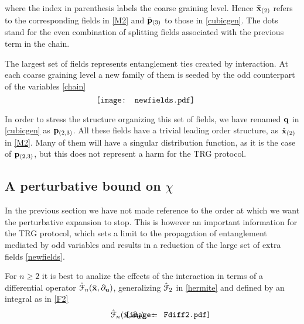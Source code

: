 \documentclass[a4paper,preprintnumbers,nofootinbib,twocolumn]{quantumarticle}
\begin{document}
\noindent  where the index in parenthesis labels the coarse graining level. 
Hence ${\bar {\bf x}}_{(2)}$ refers to the corresponding fields in \eqref{M2} and ${\bar {\bf p}}_{(3)}$ to those in \eqref{cubicgen}.
The dots stand for the even combination of splitting fields associated with the previous term in the chain.

The largest set of fields represents entanglement ties created by interaction. At each coarse graining level a new family of them is seeded by the odd counterpart
of the variables \eqref{chain}
\vspace*{-2.4cm}
\begin{equation}
 \vcenter{\hbox{\hspace{-17mm} \texttt{[image: newfields.pdf]}}} \hspace{-10mm}
\label{newfields} 
\end{equation}
\vspace*{-2.6cm}

\noindent In order to stress the structure organizing this set of fields,
we have renamed ${\bf q}$ in \eqref{cubicgen} as ${\bf p}_{(2,3)}$. 
All these fields have a trivial leading order structure, as ${\hat {\bf x}}_{(2)}$ in \eqref{M2}. Many of them will have a singular 
distribution function, as it is the case of ${\bf p}_{(2,3)}$, but this does not represent a harm for the TRG protocol. 


\subsection{A perturbative bound on $\chi$}

In the previous section we have not made reference to the order at which we want the perturbative expansion to stop.
This is however an important information for the TRG protocol, which sets a limit to the propagation of entanglement mediated by odd variables and
results in a reduction of the large set of extra fields \eqref{newfields}.

For $n \geq 2$ it is best to analize the effects of the interaction in terms of  
a differential operator ${\hat {\cal F}}_n({\bar {\bf x}},\partial_{\bf u} )$, generalizing ${\hat {\cal F}}_2$ in \eqref{hermite} and defined by an integral as in \eqref{F2}
\vspace*{-3.1cm}
\begin{equation}
\hspace{-5mm} {\hat {\cal F}}_n({\bar {\bf x}},\partial_{\bf u} )\;\; = 
\vcenter{ \hbox{\hspace{-16mm} \texttt{[image: Fdiff2.pdf]}}} \hspace{-15mm}  \ . \label{Fgraph1}
\end{equation}
\vspace*{-3.4cm}
\end{document}
